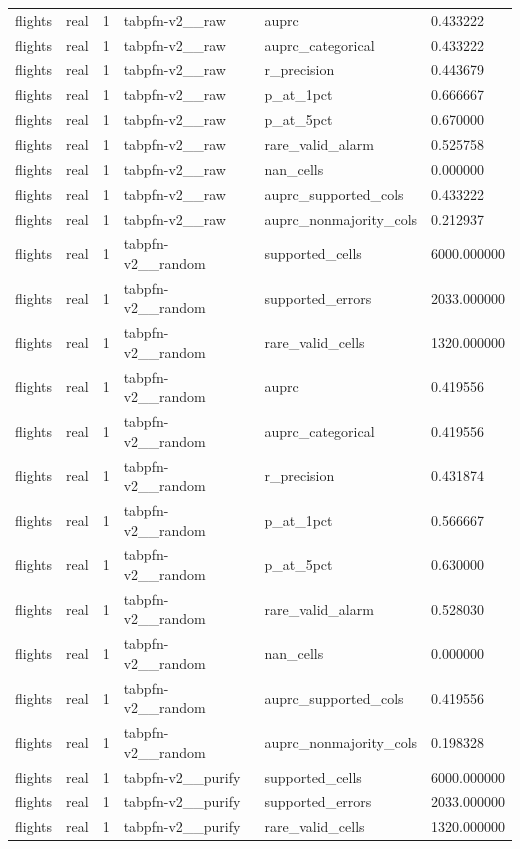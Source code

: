 \begin{tabular}{llllll}
flights & real & 1 & tabpfn-v2\_\_raw & auprc & 0.433222 \\
flights & real & 1 & tabpfn-v2\_\_raw & auprc\_categorical & 0.433222 \\
flights & real & 1 & tabpfn-v2\_\_raw & r\_precision & 0.443679 \\
flights & real & 1 & tabpfn-v2\_\_raw & p\_at\_1pct & 0.666667 \\
flights & real & 1 & tabpfn-v2\_\_raw & p\_at\_5pct & 0.670000 \\
flights & real & 1 & tabpfn-v2\_\_raw & rare\_valid\_alarm & 0.525758 \\
flights & real & 1 & tabpfn-v2\_\_raw & nan\_cells & 0.000000 \\
flights & real & 1 & tabpfn-v2\_\_raw & auprc\_supported\_cols & 0.433222 \\
flights & real & 1 & tabpfn-v2\_\_raw & auprc\_nonmajority\_cols & 0.212937 \\
flights & real & 1 & tabpfn-v2\_\_random & supported\_cells & 6000.000000 \\
flights & real & 1 & tabpfn-v2\_\_random & supported\_errors & 2033.000000 \\
flights & real & 1 & tabpfn-v2\_\_random & rare\_valid\_cells & 1320.000000 \\
flights & real & 1 & tabpfn-v2\_\_random & auprc & 0.419556 \\
flights & real & 1 & tabpfn-v2\_\_random & auprc\_categorical & 0.419556 \\
flights & real & 1 & tabpfn-v2\_\_random & r\_precision & 0.431874 \\
flights & real & 1 & tabpfn-v2\_\_random & p\_at\_1pct & 0.566667 \\
flights & real & 1 & tabpfn-v2\_\_random & p\_at\_5pct & 0.630000 \\
flights & real & 1 & tabpfn-v2\_\_random & rare\_valid\_alarm & 0.528030 \\
flights & real & 1 & tabpfn-v2\_\_random & nan\_cells & 0.000000 \\
flights & real & 1 & tabpfn-v2\_\_random & auprc\_supported\_cols & 0.419556 \\
flights & real & 1 & tabpfn-v2\_\_random & auprc\_nonmajority\_cols & 0.198328 \\
flights & real & 1 & tabpfn-v2\_\_purify & supported\_cells & 6000.000000 \\
flights & real & 1 & tabpfn-v2\_\_purify & supported\_errors & 2033.000000 \\
flights & real & 1 & tabpfn-v2\_\_purify & rare\_valid\_cells & 1320.000000 \\

\end{tabular}
